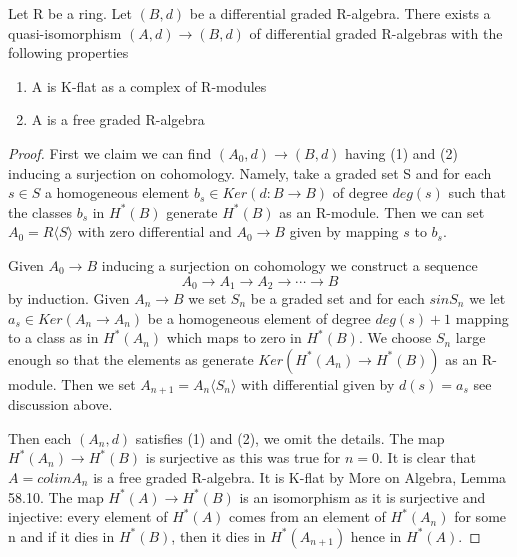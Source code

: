 \begin{lemma}{38.1}
Let R be a ring. Let $(B, d)$ be a differential graded R-algebra. There exists a quasi-isomorphism $(A, d) \longrightarrow (B, d)$ of differential graded R-algebras with the following properties
\begin{enumerate}
    \item A is K-flat as a complex of R-modules
    \item A is a free graded R-algebra
\end{enumerate}
\end{lemma}
\begin{proof}
First we claim we can find $(A_0, d) \longrightarrow (B, d)$ having (1) and (2) inducing a surjection on cohomology. Namely, take a graded set S and for each $s \in S$ a homogeneous element $b_s \in Ker(d : B \rightarrow B)$ of degree $deg(s)$ such that the classes $b_s$ in $H^*(B)$ generate $H^*(B)$ as an R-module. Then we can set $A_0 = R\langle S\rangle$ with zero differential and $A_0 \longrightarrow B$ given by mapping $s$ to $b_s$.

Given $A_0 \longrightarrow B$ inducing a surjection on cohomology we construct a sequence
\begin{equation*}
    A_0\longrightarrow A_1 \longrightarrow A_2 \longrightarrow \cdots \longrightarrow B
\end{equation*}
by induction. Given $A_n \longrightarrow B$ we set $S_n$ be a graded set and for each $s in S_n$ we let $a_s \in Ker(A_n \rightarrow A_n)$ be a homogeneous element of degree $deg(s) + 1$ mapping to a class as in $H^*(A_n)$ which maps to zero in $H^*(B)$. We choose $S_n$ large enough so that the elements as generate $Ker(H^*(A_n) \rightarrow H^*(B))$ as an R-module. Then we set $A_{n+1} = A_n \langle S_n\rangle$ with differential given by $d(s) = a_s$ see discussion above. 

Then each $(A_n, d)$ satisfies (1) and (2), we omit the details. The map $H^*(A_n) \longrightarrow H^*(B)$ is surjective as this was true for $n = 0$. It is clear that $A = colim A_n$ is a free graded R-algebra. It is K-flat by More on Algebra, Lemma 58.10. The map $H^*(A) \longrightarrow H^*(B)$ is an isomorphism as it is surjective and injective: every element of $H^*(A)$ comes from an element of $H^*(A_n)$ for some n and if it dies in $H^*(B)$, then it dies in $H^*(A_{n+1})$ hence in $H^*(A)$. 
\end{proof}






